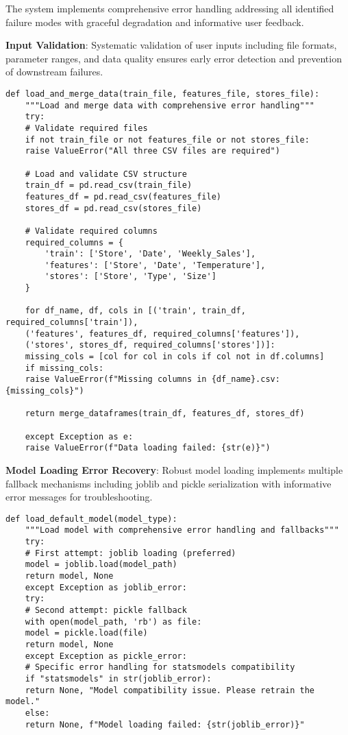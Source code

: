 The system implements comprehensive error handling addressing all identified failure modes with graceful degradation and informative user feedback.

\textbf{Input Validation}: Systematic validation of user inputs including file formats, parameter ranges, and data quality ensures early error detection and prevention of downstream failures.

\begin{lstlisting}[style=bashstyle, caption={Input Validation and Error Handling}]
	def load_and_merge_data(train_file, features_file, stores_file):
	"""Load and merge data with comprehensive error handling"""
	try:
	# Validate required files
	if not train_file or not features_file or not stores_file:
	raise ValueError("All three CSV files are required")
	
	# Load and validate CSV structure
	train_df = pd.read_csv(train_file)
	features_df = pd.read_csv(features_file)
	stores_df = pd.read_csv(stores_file)
	
	# Validate required columns
	required_columns = {
		'train': ['Store', 'Date', 'Weekly_Sales'],
		'features': ['Store', 'Date', 'Temperature'],
		'stores': ['Store', 'Type', 'Size']
	}
	
	for df_name, df, cols in [('train', train_df, required_columns['train']),
	('features', features_df, required_columns['features']),
	('stores', stores_df, required_columns['stores'])]:
	missing_cols = [col for col in cols if col not in df.columns]
	if missing_cols:
	raise ValueError(f"Missing columns in {df_name}.csv: {missing_cols}")
	
	return merge_dataframes(train_df, features_df, stores_df)
	
	except Exception as e:
	raise ValueError(f"Data loading failed: {str(e)}")
\end{lstlisting}

\textbf{Model Loading Error Recovery}: Robust model loading implements multiple fallback mechanisms including joblib and pickle serialization with informative error messages for troubleshooting.

\begin{lstlisting}[style=bashstyle, caption={Model Loading Error Handling}]
	def load_default_model(model_type):
	"""Load model with comprehensive error handling and fallbacks"""
	try:
	# First attempt: joblib loading (preferred)
	model = joblib.load(model_path)
	return model, None
	except Exception as joblib_error:
	try:
	# Second attempt: pickle fallback
	with open(model_path, 'rb') as file:
	model = pickle.load(file)
	return model, None
	except Exception as pickle_error:
	# Specific error handling for statsmodels compatibility
	if "statsmodels" in str(joblib_error):
	return None, "Model compatibility issue. Please retrain the model."
	else:
	return None, f"Model loading failed: {str(joblib_error)}"
\end{lstlisting}

